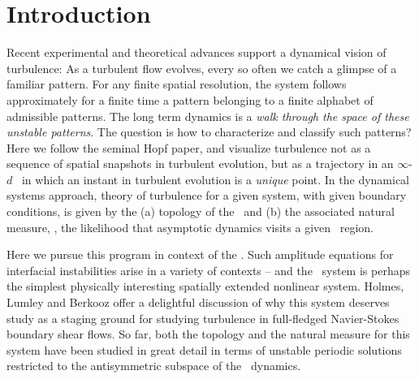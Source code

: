 %

\section{Introduction}

Recent experimental and theoretical advances
support a dynamical vision
of turbulence:
As a turbulent flow evolves,
every so often we catch a glimpse of a familiar pattern.
For any finite  spatial resolution,
the system follows approximately for a finite time 
a pattern belonging to a 
{ finite alphabet}
of admissible patterns.
The long term dynamics is
a {\em walk through the space of these unstable patterns}.
The question is how to characterize and classify such patterns?
Here we follow the seminal Hopf paper, and  visualize
turbulence not as  a sequence of 
spatial snapshots in turbulent evolution,
but as a trajectory in an 
 $\infty$-$d$ \statesp\ in which an
instant in turbulent evolution is
a {\em unique} point. In the dynamical systems approach,  
theory of turbulence for a given system, with given boundary conditions,
is given by the
(a) topology of the \statesp\ and (b) the associated natural measure, 
\ie,
the likelihood that asymptotic dynamics visits a given \statesp\ region.

Here we pursue this program in context of
the \KSe{}.
Such 
amplitude equations for interfacial instabilities arise in a variety
of contexts -- and 
the \KS\ system is perhaps the
simplest physically interesting spatially extended nonlinear system.
Holmes, Lumley
and Berkooz offer a delightful discussion of why this system
deserves study as a staging ground for studying turbulence in 
full-fledged Navier-Stokes boundary shear flows. 
So far, both the topology and the natural measure for
this system have been studied in great detail%
in terms of unstable periodic solutions
restricted to
the antisymmetric subspace of the \KS\ dynamics.

